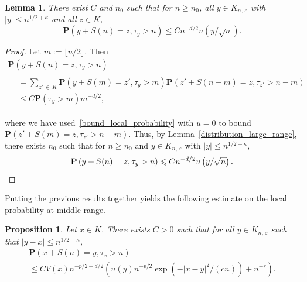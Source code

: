 \documentclass[10pt]{amsart}
\newtheorem{lemm}[theo]{Lemma}\newtheorem{prop}[theo]{Proposition}\newtheorem{coro}[theo]{Corollary}\newtheorem{conj}[theo]{Conjecture}
\theoremstyle{definition}\newtheorem{defi}[theo]{Definition}\newtheorem{rema}[theo]{Remark}\newtheorem{exam}[theo]{Example}\newtheorem{exem}[theo]{Example}\newtheorem{nota}[theo]{Notation}
\newcommand{\pr}{\mathbf{P}}
\renewcommand{\epsilon}{\varepsilon}
\renewcommand{\leq}{\leqslant}
\renewcommand{\geq}{\geqslant}
\begin{document}
\begin{lemm}\label{roughBoundLocal}
There exist $C$ and $n_{0}$ such that for $n\geq n_{0}$, all $y\in {K}_{n,\,\epsilon}$ with $|y|\leq n^{1/2+\kappa}$ and all $z\in {K}$,
\[
\pr\left(y+S(n)=z,\tau_{y}>n\right)\leq Cn^{-d/2}u\left(y/\sqrt{n}\right).
\]
\end{lemm}


\begin{proof}
Let $m:=\lfloor n/2\rfloor$. Then
\begin{multline*}
\pr\left(y+S(n)=z,\tau_{y}>n\right)\\
\begin{aligned}
&=\sum_{z'\,\in\,{K}}\pr\left(y+S(m)=z',\tau_{y}>m\right)\pr\left(z'+S(n-m)=z,\tau_{z'}>n-m\right)\\
&\leq C\pr\left(\tau_{y}>m\right)m^{-d/2},
\end{aligned}
\end{multline*}

\noindent where we have used~\eqref{bound_local_probability} with $u=0$ to bound $\pr(z'+S(m)=z,\tau_{z'}>n-m)$. Thus, by Lemma~\ref{distribution_large_range}, there exists $n_{0}$ such that for $n\geq n_{0}$ and $y\in{K}_{n,\,\epsilon}$ with $|y| \leq n^{1/2+\kappa}$,
\[
\pr\left(y+S(n)=z,\tau_{y}>n\right)\leq Cn^{-d/2}u\left(y/\sqrt{n}\right).\qedhere
\]
\end{proof}

Putting the previous results together yields the following estimate on the local probability at middle range.

\begin{prop}\label{bound_local_far_away}
Let $x\in{K}$. There exists $C>0$ such that for all $y\in{K}_{n,\,\epsilon}$ such that $|y-x|\leq n^{1/2+\kappa}$,
\begin{multline*}
\pr\left(x+S(n)=y,\tau_{x}>n\right)\\
\leq CV(x)n^{-p/2-d/2}\left(u(y)n^{-p/2}\exp\left(-|x-y|^{2}/(c n)\right)+ n^{-r}\right).
\end{multline*}
\end{prop}
\end{document}
